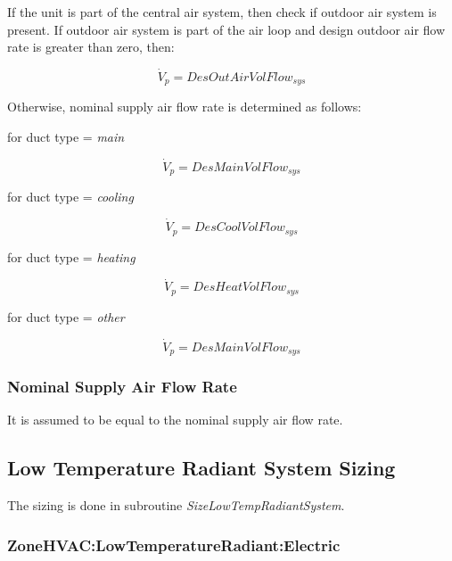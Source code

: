 If the unit is part of the central air system, then check if outdoor air system is present. If outdoor air system is part of the air loop and design outdoor air flow rate is greater than zero, then:

\begin{equation}
{\dot V_p} = DesOutAirVolFlo{w_{sys}}
\end{equation}

Otherwise, nominal supply air flow rate is determined as follows:

for duct type = \emph{main}

\begin{equation}
{\dot V_p} = DesMainVolFlo{w_{sys}}
\end{equation}

for duct type = \emph{cooling}

\begin{equation}
{\dot V_p} = DesCoolVolFlo{w_{sys}}
\end{equation}

for duct type = \emph{heating}

\begin{equation}
{\dot V_p} = DesHeatVolFlo{w_{sys}}
\end{equation}

for duct type = \emph{other}

\begin{equation}
{\dot V_p} = DesMainVolFlo{w_{sys}}
\end{equation}

\subsubsection{Nominal Supply Air Flow Rate}\label{nominal-supply-air-flow-rate-1}

It is assumed to be equal to the nominal supply air flow rate.

\subsection{Low Temperature Radiant System Sizing}\label{low-temperature-radiant-system-sizing}

The sizing is done in subroutine \emph{SizeLowTempRadiantSystem}.

\subsubsection{ZoneHVAC:LowTemperatureRadiant:Electric}\label{zonehvaclowtemperatureradiantelectric}

